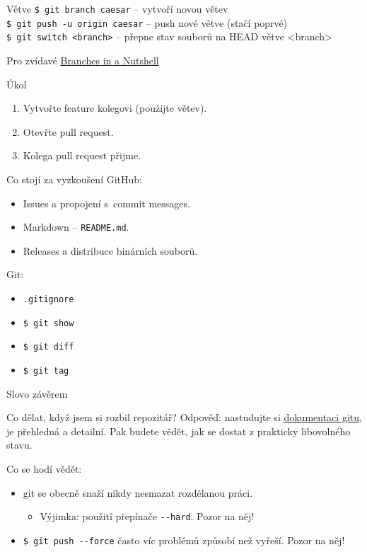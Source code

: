 \documentclass[
]{beamer}
\begin{document}
\begin{frame}{Větve}
\texttt{\$ git branch caesar} – vytvoří novou větev \\
\texttt{\$ git push -u origin caesar} – push nové větve (stačí poprvé) \\
\texttt{\$ git switch <branch>} – přepne stav souborů na HEAD větve <branch>

\begin{block}{Pro zvídavé}
\href{https://git-scm.com/book/en/v2/Git-Branching-Branches-in-a-Nutshell}{Branches in a Nutshell}
\end{block}

\begin{alertblock}{Úkol}
\begin{enumerate}
	\item Vytvořte feature kolegovi (použijte větev).
	\item Otevřte pull request.
	\item Kolega pull request přijme.
\end{enumerate}
\end{alertblock}
\end{frame}


\begin{frame}{Co stojí za vyzkoušení}
GitHub:
\begin{itemize}
	\item Issues a propojení s commit messages.
	\item Markdown – \texttt{README.md}.
	\item Releases a distribuce binárních souborů.
\end{itemize}

Git:
\begin{itemize}
	\item \texttt{.gitignore}
	\item \texttt{\$ git show}
	\item \texttt{\$ git diff}
	\item \texttt{\$ git tag}
\end{itemize}
\end{frame}


\begin{frame}{Slovo závěrem}
\begin{block}{Co dělat, když jsem si rozbil repozitář?}
Odpověď: nastudujte si \href{https://git-scm.com/doc}{dokumentaci gitu}, je
přehledná a detailní. Pak budete vědět, jak se dostat z prakticky libovolného stavu.
\end{block}

Co se hodí vědět:

\begin{itemize}
	\item git se obecně snaží nikdy nesmazat rozdělanou práci.
	\begin{itemize}
		\item Výjimka: použití přepínače \texttt{-{}-hard}. Pozor na něj!
	\end{itemize}
	\item \texttt{\$ git push -{}-force} často víc problémů způsobí než vyřeší.
	Pozor na něj!
\end{itemize}
\end{frame}
\end{document}
